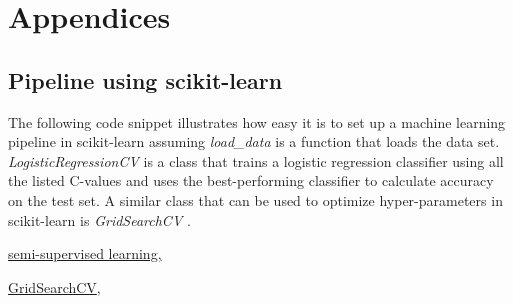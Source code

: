 \documentclass[fleqn,10pt]{SelfArx} %
\begin{document}

\section{Appendices}

\subsection{Pipeline using scikit-learn} \label{sklearn-example}

The following code snippet illustrates how easy it is to set up a machine
learning pipeline in scikit-learn assuming \textit{load\_data} is a function that
loads the data set. \textit{LogisticRegressionCV} is a class that trains a
logistic regression classifier using all the listed C-values and uses the
best-performing classifier to calculate accuracy on the test set. A similar
class that can be used to optimize hyper-parameters in scikit-learn is
\textit{GridSearchCV} \cite{gridsearchcv}.




\begin{thebibliography}{2}

  \href{http://scikit-learn.org/stable/modules/generated/sklearn.semi\_supervised.LabelSpreading.html}{semi-supervised learning,}

  \href{http://scikit-learn.org/stable/modules/generated/sklearn.model\_selection.GridSearchCV.html}{GridSearchCV}, \\
\end{thebibliography}

\end{document}
